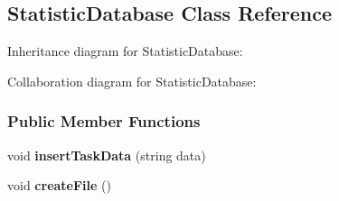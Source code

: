 \hypertarget{a00037}{}\subsection{Statistic\+Database Class Reference}
\label{a00037}


Inheritance diagram for Statistic\+Database\+:


Collaboration diagram for Statistic\+Database\+:
\subsubsection*{Public Member Functions}
\begin{DoxyCompactItemize}
\item 
\hypertarget{a00037_ab900a61b8b7bb8831310595ec218d9a7}{}void {\bfseries insert\+Task\+Data} (string data)\label{a00037_ab900a61b8b7bb8831310595ec218d9a7}

\item 
\hypertarget{a00037_a61738008aaa921c5e25248944e003763}{}void {\bfseries create\+File} ()\label{a00037_a61738008aaa921c5e25248944e003763}

\end{DoxyCompactItemize}
